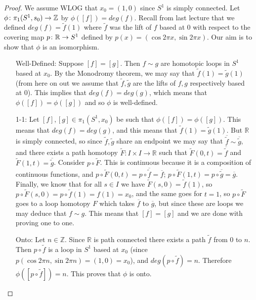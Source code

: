 \begin{proof}
We assume WLOG that $x_0=(1,0)$ since $S^1$ is simply connected. Let $\phi \colon \pi_1(S^1,s_0)\to \mathbb Z$ by $\phi([f])=deg(f)$. Recall from last lecture that we defined $deg(f)=\tilde{f}(1)$ where $\tilde{f}$ was the lift of $f$ based at $0$ with respect to the covering map $p\colon \mathbb R\to S^1$ defined by $p(x)=(\cos 2\pi x, \sin 2\pi x)$. Our aim is to show that $\phi$ is an isomorphism.

\begin{itemize}
\item[Well-Defined:]
Suppose $[f]=[g]$. Then $f\sim g$ are homotopic loops in $S^1$ based at $x_0$. By the Monodromy theorem, we may say that $\tilde{f}(1)=\tilde{g}(1)$ (from here on out we assume that $\tilde{f},\tilde{g}$ are the lifts of $f,g$ respectively based at $0$). This implies that $deg(f)=deg(g)$, which means that $\phi([f])=\phi([g])$ and so $\phi$ is well-defined.

\item[1-1:]
Let $[f],[g]\in \pi_1(S^1,x_0)$ be such that $\phi([f])=\phi([g])$. This means that $deg(f)=deg(g)$, and this means that $\tilde{f}(1)=\tilde{g}(1)$. But $\mathbb{R}$ is simply connected, so since $\tilde{f},\tilde{g}$ share an endpoint we may say that $\overline{\tilde{f}}\sim \overline{\tilde{g}}$, and there exists a path homotopy $\tilde{F}\colon I\times I\to \mathbb{R}$ such that $\tilde{F}(0,t)=\overline{\tilde{f}}$ and $\tilde{F}(1,t)=\overline{\tilde{g}}$. Consider $p\circ \tilde{F}$. This is continuous because it is a composition of continuous functions, and $p\circ \tilde{F}(0,t)=p\circ \overline{\tilde{f}}=\overline{f}$; $p\circ \tilde{F}(1,t)=p\circ \overline{\tilde{g}}=\overline{g}$. Finally, we know that for all $s\in I$ we have $\tilde{F}(s,0)=\tilde{f}(1)$, so $p\circ \tilde{F}(s,0)=p\circ \tilde{f}(1)=f(1)=x_0$, and the same goes for $t=1$, so $p\circ \tilde{F}$ goes to a loop homotopy $F$ which takes $\overline{f}$ to $\overline{g}$, but since these are loops we may deduce that $f\sim g$. This means that $[f]=[g]$ and we are done with proving one to one.

\item[Onto:]
Let $n\in \mathbb{Z}$. Since $\mathbb{R}$ is path connected there exists a path $\tilde{f}$ from $0$ to $n$. Then $p\circ \tilde{f}$ is a loop in $S^1$ based at $x_0$ (since $p(\cos 2\pi n, \sin 2\pi n)=(1,0)=x_0$), and $deg(p\circ \tilde{f})=n$. Therefore $\phi([p\circ \tilde{f}])=n$. This proves that $\phi$ is onto.


\end{itemize}
\end{proof}
